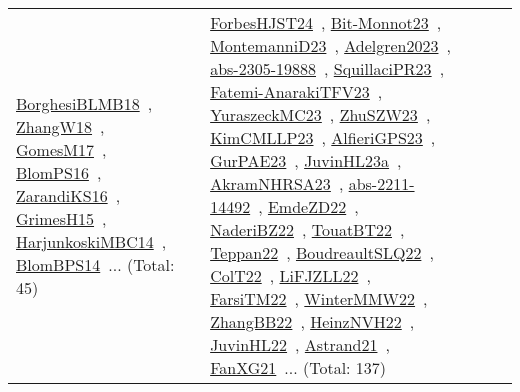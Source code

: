 {\begin{longtable}{lp{3cm}>{\raggedright\arraybackslash}p{6cm}>{\raggedright\arraybackslash}p{6cm}>{\raggedright\arraybackslash}p{8cm}}
\href{../works/BorghesiBLMB18.pdf}{BorghesiBLMB18}~\cite{BorghesiBLMB18}, \href{../works/ZhangW18.pdf}{ZhangW18}~\cite{ZhangW18}, \href{../works/GomesM17.pdf}{GomesM17}~\cite{GomesM17}, \href{../works/BlomPS16.pdf}{BlomPS16}~\cite{BlomPS16}, \href{../works/ZarandiKS16.pdf}{ZarandiKS16}~\cite{ZarandiKS16}, \href{../works/GrimesH15.pdf}{GrimesH15}~\cite{GrimesH15}, \href{../works/HarjunkoskiMBC14.pdf}{HarjunkoskiMBC14}~\cite{HarjunkoskiMBC14}, \href{../works/BlomBPS14.pdf}{BlomBPS14}~\cite{BlomBPS14}... (Total: 45) & \href{../works/ForbesHJST24.pdf}{ForbesHJST24}~\cite{ForbesHJST24}, \href{../works/Bit-Monnot23.pdf}{Bit-Monnot23}~\cite{Bit-Monnot23}, \href{../works/MontemanniD23.pdf}{MontemanniD23}~\cite{MontemanniD23}, \href{../works/Adelgren2023.pdf}{Adelgren2023}~\cite{Adelgren2023}, \href{../works/abs-2305-19888.pdf}{abs-2305-19888}~\cite{abs-2305-19888}, \href{../works/SquillaciPR23.pdf}{SquillaciPR23}~\cite{SquillaciPR23}, \href{../works/Fatemi-AnarakiTFV23.pdf}{Fatemi-AnarakiTFV23}~\cite{Fatemi-AnarakiTFV23}, \href{../works/YuraszeckMC23.pdf}{YuraszeckMC23}~\cite{YuraszeckMC23}, \href{../works/ZhuSZW23.pdf}{ZhuSZW23}~\cite{ZhuSZW23}, \href{../works/KimCMLLP23.pdf}{KimCMLLP23}~\cite{KimCMLLP23}, \href{../works/AlfieriGPS23.pdf}{AlfieriGPS23}~\cite{AlfieriGPS23}, \href{../works/GurPAE23.pdf}{GurPAE23}~\cite{GurPAE23}, \href{../works/JuvinHL23a.pdf}{JuvinHL23a}~\cite{JuvinHL23a}, \href{../works/AkramNHRSA23.pdf}{AkramNHRSA23}~\cite{AkramNHRSA23}, \href{../works/abs-2211-14492.pdf}{abs-2211-14492}~\cite{abs-2211-14492}, \href{../works/EmdeZD22.pdf}{EmdeZD22}~\cite{EmdeZD22}, \href{../works/NaderiBZ22.pdf}{NaderiBZ22}~\cite{NaderiBZ22}, \href{../works/TouatBT22.pdf}{TouatBT22}~\cite{TouatBT22}, \href{../works/Teppan22.pdf}{Teppan22}~\cite{Teppan22}, \href{../works/BoudreaultSLQ22.pdf}{BoudreaultSLQ22}~\cite{BoudreaultSLQ22}, \href{../works/ColT22.pdf}{ColT22}~\cite{ColT22}, \href{../works/LiFJZLL22.pdf}{LiFJZLL22}~\cite{LiFJZLL22}, \href{../works/FarsiTM22.pdf}{FarsiTM22}~\cite{FarsiTM22}, \href{../works/WinterMMW22.pdf}{WinterMMW22}~\cite{WinterMMW22}, \href{../works/ZhangBB22.pdf}{ZhangBB22}~\cite{ZhangBB22}, \href{../works/HeinzNVH22.pdf}{HeinzNVH22}~\cite{HeinzNVH22}, \href{../works/JuvinHL22.pdf}{JuvinHL22}~\cite{JuvinHL22}, \href{../works/Astrand21.pdf}{Astrand21}~\cite{Astrand21}, \href{../works/FanXG21.pdf}{FanXG21}~\cite{FanXG21}... (Total: 137)\\

\end{longtable}}
